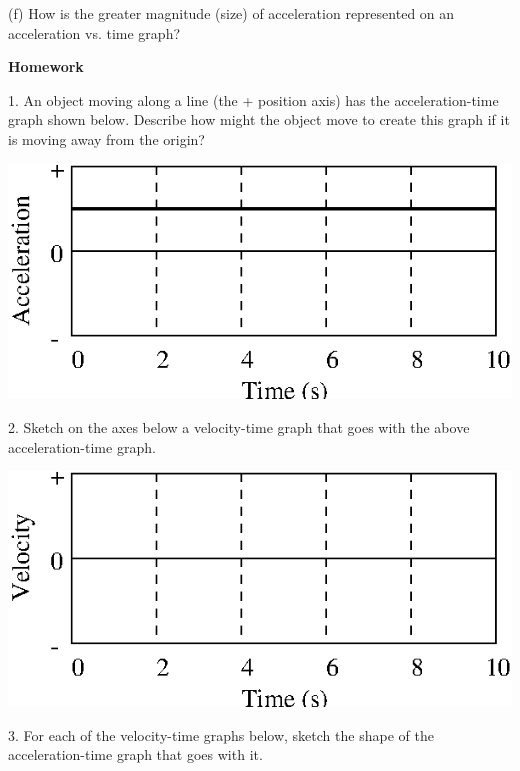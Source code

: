 (f) How is the greater magnitude (size) of acceleration represented on an acceleration
vs. time graph? 
\answerspace{25mm}

\pagebreak[2]
\textbf{Homework} 

1. An object moving along a line (the + position axis) has the acceleration-time
graph shown below. Describe how might the object move to create this graph if
it is moving away from the origin?

\vspace{0.3cm}
{\par \centering \includegraphics{changing/changing_fig6.eps} \par}
\answerspace{1.5cm}

2. Sketch on the axes below a velocity-time graph that goes with the above acceleration-time
graph.

\vspace{0.3cm}
{\par\centering \includegraphics{changing/changing_fig7.eps} \par}
\vspace{0.4cm}

3. For each of the velocity-time graphs below, sketch the shape of the acceleration-time
graph that goes with it.


